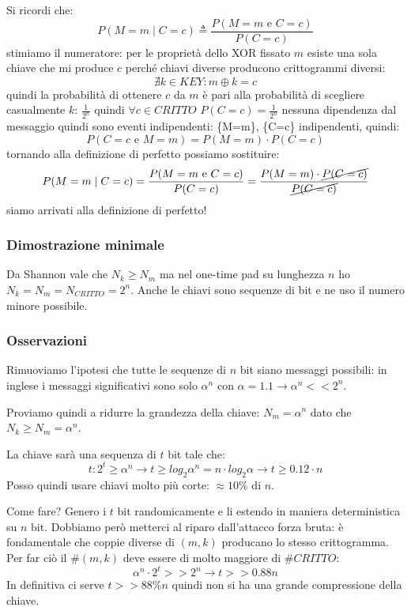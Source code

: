 Si ricordi che:
$$ P(M=m \mid C=c) \triangleq \frac{P(M=m\text{ e }C=c)}{P(C=c)} $$
stimiamo il numeratore: per le proprietà dello XOR fissato $m$ esiste una sola chiave che mi produce $c$ perché chiavi diverse producono crittogrammi diversi:
$$ \nexists k \in KEY: m \oplus k = c $$
quindi la probabilità di ottenere $c$ da $m$ è pari alla probabilità di scegliere casualmente $k$: $\frac{1}{2^n}$
quindi $\forall c \in CRITTO$ $P(C=c)=\frac{1}{2^n}$
nessuna dipendenza dal messaggio quindi sono eventi indipendenti: \{M=m\}, \{C=c\} indipendenti, quindi:
$$ P(C=c\text{ e }M=m) = P(M=m) \cdot P(C=c) $$
tornando alla definizione di perfetto possiamo sostituire:
$$
    P(M=m \mid C=c) = \frac{P(M=m\text{ e }C=c)}{P(C=c)} = \frac{P(M=m) \cdot \cancel{P(C=c)}}{\cancel{P(C=c)}}
$$
siamo arrivati alla definizione di perfetto!

\subsubsection{Dimostrazione minimale}
Da Shannon vale che $N_k \geq N_m$ ma nel one-time pad su lunghezza
$n$ ho $N_k = N_m= N_{CRITTO} = 2^n$.
Anche le chiavi sono sequenze di bit e ne uso il numero minore possibile.

\subsubsection{Osservazioni}
Rimuoviamo l'ipotesi che tutte le sequenze di $n$ bit siano messaggi possibili:
in inglese i messaggi significativi sono solo $\alpha^{n}$ con $\alpha = 1.1 \xrightarrow{} \alpha^n << 2^n$.

Proviamo quindi a ridurre la grandezza della chiave:
$N_m = \alpha^n$ dato che $N_k \geq N_m = \alpha^n$.

La chiave sarà una sequenza di $t$ bit tale che:
$$ t: 2^t \geq \alpha^n \xrightarrow{} t \geq log_2\alpha^n = n \cdot log_2\alpha \xrightarrow{} t \geq 0.12 \cdot n$$
Posso quindi usare chiavi molto più corte: $\approx 10\%$ di $n$.

Come fare? Genero i $t$ bit randomicamente e li estendo in maniera deterministica su $n$ bit.
Dobbiamo però metterci al riparo dall'attacco forza bruta: è fondamentale che coppie diverse di
$(m, k)$ producano lo stesso crittogramma. Per far ciò il $\#(m, k)$ deve essere di molto maggiore di $\#CRITTO$:
$$ \alpha^n \cdot 2^t >> 2^n \xrightarrow{} t >> 0.88n$$
In definitiva ci serve $t >> 88\%n$ quindi non si ha una grande compressione della chiave.